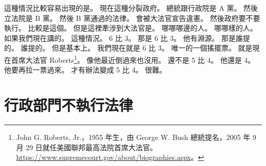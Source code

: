 \hypertarget{w01:cue:1979}{}這種情況比較容易出現的是。
\hypertarget{w01:cue:1980}{}現在這種分裂政府。
\hypertarget{w01:cue:1981}{}總統跟行政院是 A 黨。
\hypertarget{w01:cue:1982}{}然後立法院是 B 黨。
\hypertarget{w01:cue:1983}{}然後 B 黨通過的法律。
\hypertarget{w01:cue:1984}{}會被大法官宣告違憲。
\hypertarget{w01:cue:1985}{}然後政府要不要執行。
\hypertarget{w01:cue:1986}{}比較是這個。
\hypertarget{w01:cue:1987}{}但是這裡牽涉到大法官是。
\hypertarget{w01:cue:1988}{}哪哪哪邊的人。
\hypertarget{w01:cue:1989}{}哪哪樣的人。
\hypertarget{w01:cue:1990}{}如果我們現在講的。
\hypertarget{w01:cue:1991}{}這種情況。
\hypertarget{w01:cue:1992}{}6 比 3。
\hypertarget{w01:cue:1993}{}那是 6 比 3。
\hypertarget{w01:cue:1994}{}他有淵源。
\hypertarget{w01:cue:1995}{}那是誰提的。
\hypertarget{w01:cue:1996}{}誰提的。
\hypertarget{w01:cue:1997}{}但是基本上。
\hypertarget{w01:cue:1998}{}我們現在就是 6 比 3。
\hypertarget{w01:cue:1999}{}唯一的一個搖擺票。
\hypertarget{w01:cue:2000}{}就是現在首席大法官 Roberts\footnote{John G. Roberts, Jr.，1955 年生，由 George W. Bush 總統提名，2005 年 9 月 29 日就任美國聯邦最高法院首席大法官。\url{https://www.supremecourt.gov/about/biographies.aspx}。}。
\hypertarget{w01:cue:2001}{}像他最近倒過來也沒用。
\hypertarget{w01:cue:2002}{}還不是 5 比 4。
\hypertarget{w01:cue:2003}{}他還是 4。
\hypertarget{w01:cue:2004}{}他要再拉一票過來。
\hypertarget{w01:cue:2005}{}才有辦法變成 5 比 4。
\hypertarget{w01:cue:2006}{}很難。

\section{行政部門不執行法律}

